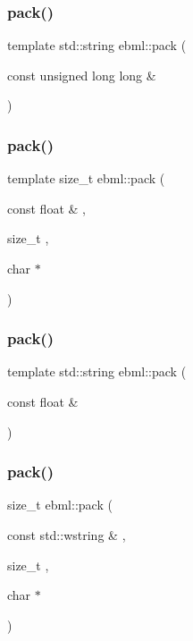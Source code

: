 \subsubsection{\texorpdfstring{pack()}{pack()}\hspace{0.1cm}{\footnotesize\ttfamily [6/24]}}
{\footnotesize\ttfamily template std\+::string ebml\+::pack (\begin{DoxyParamCaption}\item[{const unsigned long long \&}]{ }\end{DoxyParamCaption})}

\mbox{\label{namespaceebml_a2f3ac2d3e5ba0655228ae2a4a046a79f}} 
\subsubsection{\texorpdfstring{pack()}{pack()}\hspace{0.1cm}{\footnotesize\ttfamily [7/24]}}
{\footnotesize\ttfamily template size\+\_\+t ebml\+::pack (\begin{DoxyParamCaption}\item[{const float \&}]{,  }\item[{size\+\_\+t}]{,  }\item[{char $\ast$}]{ }\end{DoxyParamCaption})}

\mbox{\label{namespaceebml_acbb370dedf65bee76a4e77f8107e6b31}} 
\subsubsection{\texorpdfstring{pack()}{pack()}\hspace{0.1cm}{\footnotesize\ttfamily [8/24]}}
{\footnotesize\ttfamily template std\+::string ebml\+::pack (\begin{DoxyParamCaption}\item[{const float \&}]{ }\end{DoxyParamCaption})}

\mbox{\label{namespaceebml_afe17a10f5bbba38018c292f620088230}} 
\subsubsection{\texorpdfstring{pack()}{pack()}\hspace{0.1cm}{\footnotesize\ttfamily [9/24]}}
{\footnotesize\ttfamily size\+\_\+t ebml\+::pack (\begin{DoxyParamCaption}\item[{const std\+::wstring \&}]{,  }\item[{size\+\_\+t}]{,  }\item[{char $\ast$}]{ }\end{DoxyParamCaption})}

